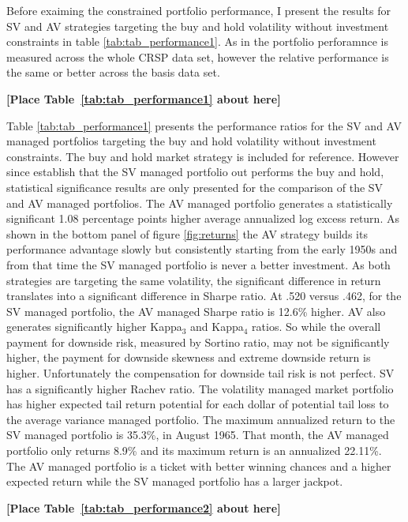 Before exaiming the constrained portfolio performance, I present the results for SV and AV strategies targeting the buy and hold volatility without investment constraints in table \ref{tab:tab_performance1}. As in \citet{moreira_volatility-managed_2017} the portfolio perforamnce is measured across the whole CRSP data set, however the relative performance is the same or better across the basis data set. 

\bigskip
\centerline{\bf [Place Table~\ref{tab:tab_performance1} about here]}
\bigskip

Table \ref{tab:tab_performance1} presents the performance ratios for the SV and AV managed portfolios targeting the buy and hold volatility without investment constraints. The buy and hold market strategy is included for reference. However since \citet{moreira_volatility-managed_2017} establish that the SV managed portfolio out performs the buy and hold, statistical significance results are only presented for the comparison of the SV and AV managed portfolios. The AV managed portfolio generates a statistically significant 1.08 percentage points higher average annualized log excess return. As shown in the bottom panel of figure \ref{fig:returns} the AV strategy builds its performance advantage slowly but consistently starting from the early 1950s and from that time the SV managed portfolio is never a better investment. As both strategies are targeting the same volatility, the significant difference in return translates into a significant difference in Sharpe ratio. At .520 versus .462, for the SV managed portfolio, the AV managed Sharpe ratio is 12.6\% higher. AV also generates significantly higher Kappa$_{3}$ and Kappa$_{4}$ ratios. So while the overall payment for downside risk, measured by Sortino ratio, may not be significantly higher, the payment for downside skewness and extreme downside return is higher. Unfortunately the compensation for downside tail risk is not perfect. SV has a significantly higher Rachev ratio. The volatility managed market portfolio has higher expected tail return potential for each dollar of potential tail loss to the average variance managed portfolio. The maximum annualized return to the SV managed portfolio is 35.3\%, in August 1965. That month, the AV managed portfolio only returns 8.9\% and its maximum return is an annualized 22.11\%. The AV managed portfolio is a ticket with better winning chances and a higher expected return while the SV managed portfolio has a larger jackpot.
\bigskip
\centerline{\bf [Place Table~\ref{tab:tab_performance2} about here]}
\bigskip

